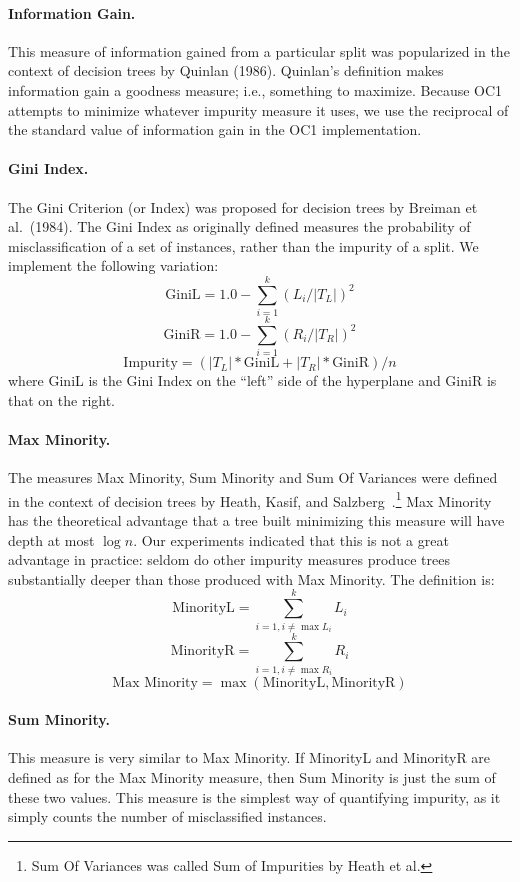 \paragraph{Information Gain.}
This measure of information gained from a particular split was
popularized in the context of decision trees by Quinlan (1986).
Quinlan's definition makes information gain a goodness measure; i.e.,
something to maximize.  Because OC1 attempts to minimize whatever
impurity measure it uses, we use the reciprocal of the standard value
of information gain in the OC1 implementation.

\paragraph{Gini Index.}
The Gini Criterion (or Index) was proposed for decision trees by
Breiman et al.\ (1984).  The Gini Index as originally
defined measures the probability of misclassification of a set of
instances, rather than the impurity of a split. We implement the
following variation:
\[ \mbox{GiniL} = 1.0 - \sum_{i=1}^{k} {(L_i / |T_L|)^2} \]  
\[ \mbox{GiniR} = 1.0 - \sum_{i=1}^{k} {(R_i / |T_R|)^2} \]  
\[ \mbox{Impurity} = (|T_L| * \mbox{GiniL} + |T_R| * \mbox{GiniR})/ n  \]
where GiniL is the Gini Index on the ``left'' side of the hyperplane and 
GiniR is that on the right.

\paragraph{Max Minority.}
The measures Max Minority, Sum Minority and Sum Of Variances were
defined in the context of decision trees by Heath, Kasif, and
Salzberg~\citeyear{heath/etal/93}.\footnote{Sum Of Variances was
called Sum of Impurities by Heath et al.}  Max Minority has the
theoretical advantage that a tree built minimizing this measure will
have depth at most $\log n$. Our experiments indicated that this is
not a great advantage in practice: seldom do other impurity measures
produce trees substantially deeper than those produced with Max
Minority.  The definition is:
\[ \mbox{MinorityL} = \sum_{i=1, i \neq \max L_i}^{k} {L_i}  \]
\[ \mbox{MinorityR} = \sum_{i=1, i \neq \max R_i}^{k} {R_i}  \]
\[ \mbox{Max Minority} =  \max (\mbox{MinorityL}, \mbox{MinorityR}) \]

\paragraph{Sum Minority.}
This measure is very similar to Max Minority.  If MinorityL and
MinorityR are defined as for the Max Minority measure, then Sum
Minority is just the sum of these two values.  This measure is the
simplest way of quantifying impurity, as it simply counts the number
of misclassified instances.

